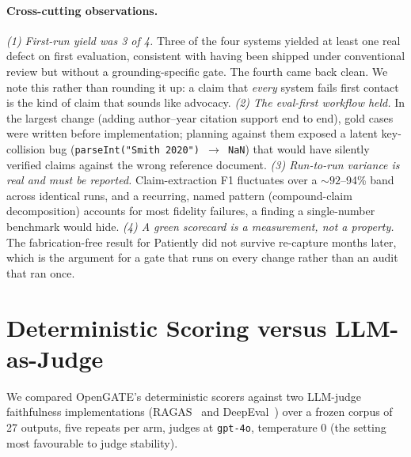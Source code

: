 \documentclass[11pt,a4paper]{article}
\begin{document}
\paragraph{Cross-cutting observations.}
\emph{(1) First-run yield was 3 of 4.} Three of the four systems yielded at least one real defect on
first evaluation, consistent with having been shipped under conventional review but without a
grounding-specific gate. The fourth came back clean. We note this rather than rounding it up: a claim
that \emph{every} system fails first contact is the kind of claim that sounds like advocacy.
\emph{(2) The eval-first workflow held.} In the largest change (adding author--year citation support
end to end), gold cases were written before implementation; planning against them exposed a latent
key-collision bug (\texttt{parseInt("Smith 2020") $\rightarrow$ NaN}) that would have silently verified
claims against the wrong reference document.
\emph{(3) Run-to-run variance is real and must be reported.} Claim-extraction F1 fluctuates over a
${\sim}92$--94\% band across identical runs, and a recurring, named pattern (compound-claim
decomposition) accounts for most fidelity failures, a finding a single-number benchmark would hide.
\emph{(4) A green scorecard is a measurement, not a property.} The fabrication-free result for
Patiently did not survive re-capture months later, which is the argument for a gate that runs on every
change rather than an audit that ran once.

\section{Deterministic Scoring versus LLM-as-Judge}
\label{sec:exp2}

We compared OpenGATE's deterministic scorers against two LLM-judge faithfulness implementations
(RAGAS~\cite{es2024ragas} and DeepEval~\cite{ip2026deepeval}) over a frozen corpus of 27 outputs,
five repeats per arm, judges at \texttt{gpt-4o}, temperature 0 (the setting most favourable to judge
stability).
\end{document}

